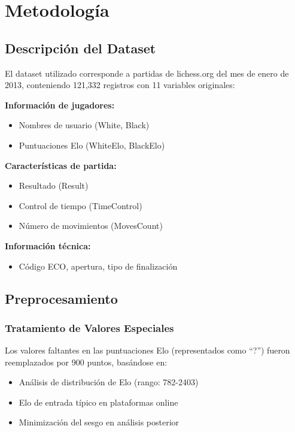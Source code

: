 \documentclass[11pt,a4paper]{article}
\begin{document}
\section{Metodolog\'ia}

\subsection{Descripci\'on del Dataset}

El dataset utilizado corresponde a partidas de lichess.org del mes de enero de 2013, conteniendo 121,332 registros con 11 variables originales:

\textbf{Informaci\'on de jugadores:}
\begin{itemize}
\item Nombres de usuario (White, Black)
\item Puntuaciones Elo (WhiteElo, BlackElo)
\end{itemize}

\textbf{Caracter\'isticas de partida:}
\begin{itemize}
\item Resultado (Result)
\item Control de tiempo (TimeControl)
\item N\'umero de movimientos (MovesCount)
\end{itemize}

\textbf{Informaci\'on t\'ecnica:}
\begin{itemize}
\item C\'odigo ECO, apertura, tipo de finalizaci\'on
\end{itemize}

\subsection{Preprocesamiento}

\subsubsection{Tratamiento de Valores Especiales}

Los valores faltantes en las puntuaciones Elo (representados como ``?'') fueron reemplazados por 900 puntos, bas\'andose en:
\begin{itemize}
\item An\'alisis de distribuci\'on de Elo (rango: 782-2403)
\item Elo de entrada t\'ipico en plataformas online
\item Minimizaci\'on del sesgo en an\'alisis posterior
\end{itemize}
\end{document}
